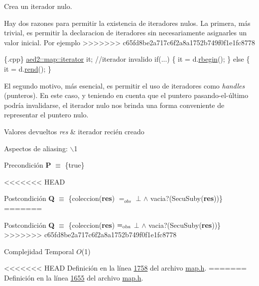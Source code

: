 \begin{Indent}
Crea un iterador nulo. 

Hay dos razones para permitir la existencia de iteradores nulos. La primera, más trivial, es permitir la declaracion de iteradores sin necesariamente asignarles un valor inicial. Por ejemplo 
>>>>>>> c65fd8be2a717c6f2a8a1752b749f0f1e1fc8778
\begin{DoxyCode}
 \{.cpp\}
 \hyperlink{classaed2_1_1map_1_1iterator}{aed2::map::iterator} it;   \textcolor{comment}{//iterador invalido}
 \textcolor{keywordflow}{if}(...) \{
   it = d.\hyperlink{classaed2_1_1map_ac412d3902112122c1bffe2d4283a4e9d_ac412d3902112122c1bffe2d4283a4e9d}{rbegin}();
 \} \textcolor{keywordflow}{else} \{
   it = d.\hyperlink{classaed2_1_1map_a277f03b4f4b6b98879e4e4921081801f_a277f03b4f4b6b98879e4e4921081801f}{rend}();
 \}
\end{DoxyCode}
 \-El segundo motivo, más esencial, es permitir el uso de iteradores como {\itshape handles\/} (punteros). \-En este caso, y teniendo en cuenta que el puntero pasando-\/el-\/último podría invalidarse, el iterador nulo nos brinda una forma conveniente de representar el puntero nulo.


\begin{DoxyRetVals}{\-Valores devueltos}
{\em res} & iterador recién creado\\
\hline
\end{DoxyRetVals}
\begin{DoxyParagraph}{\-Aspectos de aliasing\-:}
$\backslash$1
\end{DoxyParagraph}
\begin{DoxyPrecond}{\-Precondición}
{\bfseries \-P} $\equiv$ \{true\} 
\end{DoxyPrecond}
<<<<<<< HEAD
\begin{DoxyPostcond}{\-Postcondición}
{\bfseries \-Q} $\equiv$ \{coleccion({\bfseries res}) $=_{obs}$ $\bot$ $\land$ vacia?(\-Secu\-Suby({\bfseries res}))\}
=======
\begin{DoxyPostcond}{Postcondición}
{\bfseries Q} $\equiv$ \{coleccion({\bfseries res}) $=_{\rm obs}$ $\bot$ $\land$ vacia?(Secu\+Suby({\bfseries res}))\}
>>>>>>> c65fd8be2a717c6f2a8a1752b749f0f1e1fc8778
\end{DoxyPostcond}

\begin{DoxyDescription}
\item[\-Complejidad \-Temporal]$O$(1)
\end{DoxyDescription}

<<<<<<< HEAD
\-Definición en la línea \hyperlink{map_8h_source_l01758}{1758} del archivo \hyperlink{map_8h_source}{map.\-h}.
=======
Definición en la línea \hyperlink{map_8h_source_l01655}{1655} del archivo \hyperlink{map_8h_source}{map.\+h}.


\end{DoxyPostcond}
\end{Indent}
